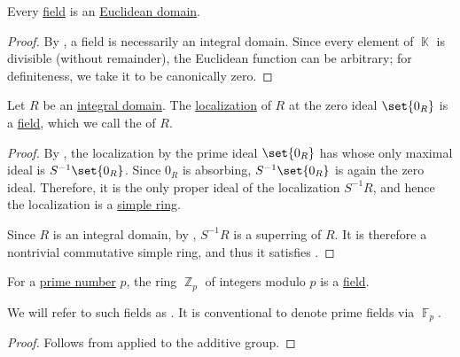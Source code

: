 \begin{proposition}\label{thm:field_is_euclidean_domain}
  Every \hyperref[def:field]{field} is an \hyperref[def:euclidean_domain]{Euclidean domain}.
\end{proposition}
\begin{proof}
  By , a field is necessarily an integral domain. Since every element of \( \BbbK \) is divisible (without remainder), the Euclidean function can be arbitrary; for definiteness, we take it to be canonically zero.
\end{proof}

\begin{proposition}\label{thm:field_of_fractions}
  Let \( R \) be an \hyperref[def:integral_domain]{integral domain}. The \hyperref[def:ring_localization]{localization} of \( R \) at the zero ideal \( \set{ 0_R } \) is a \hyperref[def:field]{field}, which we call the  of \( R \).
\end{proposition}
\begin{proof}
  By , the localization by the prime ideal \( \set{ 0_R } \) has  whose only maximal ideal is \( S^{-1} \set{ 0_R } \). Since \( 0_R \) is absorbing, \( S^{-1} \set{ 0_R } \) is again the zero ideal.  Therefore, it is the only proper ideal of the localization \( S^{-1} R \), and hence the localization is a \hyperref[def:ring/simple]{simple ring}.

  Since \( R \) is an integral domain, by , \( S^{-1} R \) is a superring of \( R \). It is therefore a nontrivial commutative simple ring, and thus it satisfies .
\end{proof}

\begin{proposition}\label{thm:prime_fields}
  For a \hyperref[def:prime_number]{prime number} \( p \), the ring \hyperref[thm:ring_of_integers_modulo]{\( \BbbZ_p \)} of integers modulo \( p \) is a \hyperref[def:field]{field}.

  We will refer to such fields as . It is conventional to denote prime fields via \( \BbbF_p \).
\end{proposition}
\begin{proof}
  Follows from  applied to the additive group.
\end{proof}

